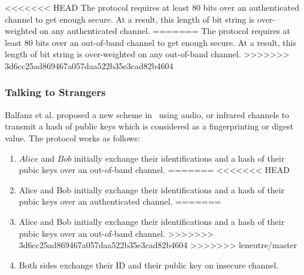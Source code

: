 <<<<<<< HEAD
The protocol requires at least 80 bits over an authenticated channel to get enough secure. At a result, this length of bit string is over-weighted on any authenticated channel. 
=======
The protocol requires at least 80 bits over an out-of-band channel to get enough secure. At a result, this length of bit string is over-weighted on any out-of-band channel. 
>>>>>>> 3d6cc25ad869467a057daa522b35e3cad82b4604
 
\subsubsection{Talking to Strangers}

Balfanz et al. proposed a new scheme in~\cite{Smetters02talkingto} using audio, or infrared channels to transmit a hash of public keys which is considered as a fingerprinting or digest value. The protocol works as follows:
\begin{enumerate}
<<<<<<< HEAD
\item $Alice$ and $Bob$ initially exchange their identifications and a hash of their pubic keys over an out-of-band channel.
=======
<<<<<<< HEAD
\item Alice and Bob initially exchange their identifications and a hash of their pubic keys over an authenticated channel.
=======
\item Alice and Bob initially exchange their identifications and a hash of their pubic keys over an out-of-band channel.
>>>>>>> 3d6cc25ad869467a057daa522b35e3cad82b4604
>>>>>>> leneutre/master
\item Both sides exchange their ID and their public key on insecure channel. 
\end{enumerate}

\begin{center}
\end{center}


